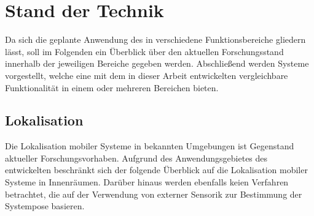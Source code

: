 \chapter{Stand der Technik}
\label{chap:tech}


Da sich die geplante Anwendung des  in verschiedene Funktionsbereiche gliedern lässt, soll im Folgenden ein Überblick über den aktuellen Forschungsstand innerhalb der jeweiligen Bereiche gegeben werden. Abschließend werden Systeme vorgestellt, welche eine mit dem in dieser Arbeit entwickelten \kps{} vergleichbare Funktionalität in einem oder mehreren Bereichen bieten.

\section{Lokalisation}
\label{chap:mcl}
Die Lokalisation mobiler Systeme in bekannten Umgebungen ist Gegenstand aktueller Forschungsvorhaben. Aufgrund des Anwendungsgebietes des entwickelten  beschränkt sich der folgende Überblick auf die Lokalisation mobiler Systeme in Innenräumen. Darüber hinaus werden ebenfalls keien Verfahren betrachtet, die auf der Verwendung von externer Sensorik zur Bestimmung der Systempose basieren.\\

